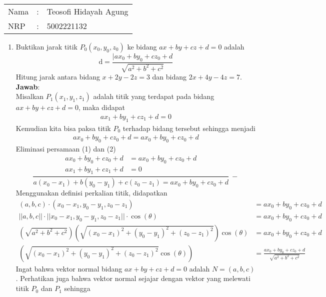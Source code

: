 \documentclass{article}
\newcommand{\jawab}{\textbf{Jawab}:}
\begin{document}
    \begin{tabular}{|lcl|}
     \hline
     Nama&:&Teosofi Hidayah Agung\\
     NRP&:&5002221132\\
     \hline
    \end{tabular}
    \begin{enumerate}
        \item Buktikan jarak titik $P_0(x_0,y_0,z_0)$ ke bidang $ax+by+cz+d=0$ adalah
        \[\textrm{d}=\frac{|ax_0+by_0+cz_0+d}{\sqrt{a^2+b^2+c^2}}\]
        Hitung jarak antara bidang $x+2y-2z=3$ dan bidang $2x+4y-4z=7$.\\
        \jawab\\
        Misalkan $P_1(x_1,y_1,z_1)$ adalah titik yang terdapat pada bidang $ax+by+cz+d=0$, maka 
        didapat
        \begin{align}
            ax_1+by_1+cz_1+d=0
        \end{align}
        Kemudian kita bisa paksa titik $P_0$ terhadap bidang tersebut sehingga menjadi
        \begin{align}
            ax_0+by_0+cz_0+d=ax_0+by_0+cz_0+d
        \end{align}
        Eliminasi persamaan (1) dan (2)
        \[\frac
        {
            \!\begin{aligned} 
                ax_0+by_0+cz_0+d&=ax_0+by_0+cz_0+d\\ 
                ax_1+by_1+cz_1+d&=0
            \end{aligned}
        }
        {
            a(x_0-x_1)+b(y_0-y_1)+c(z_0-z_1)=ax_0+by_0+cz_0+d
        }
        \ -\]
        Menggunakan definisi perkalian titik, didapatkan
        \begin{align*}
            (a,b,c)\cdot(x_0-x_1,y_0-y_1,z_0-z_1)&=ax_0+by_0+cz_0+d\\
            ||a,b,c||\cdot||x_0-x_1,y_0-y_1,z_0-z_1||\cdot\cos(\theta)&=ax_0+by_0+cz_0+d\\
            \left(\sqrt{a^2+b^2+c^2}\right)\left(\sqrt{(x_0-x_1)^2+(y_0-y_1)^2+(z_0-z_1)^2}\right)\cos(\theta)&=ax_0+by_0+cz_0+d\\
            \left(\sqrt{(x_0-x_1)^2+(y_0-y_1)^2+(z_0-z_1)^2}\cos(\theta)\right)&=\frac{ax_0+by_0+cz_0+d}{\sqrt{a^2+b^2+c^2}}
        \end{align*}
        Ingat bahwa vektor normal bidang $ax+by+cz+d=0$ adalah $N=(a,b,c)$. Perhatikan juga 
        bahwa vektor normal sejajar dengan vektor yang melewati titik $P_0$ dan $P_1$ sehingga 

\end{enumerate}
\end{document}

